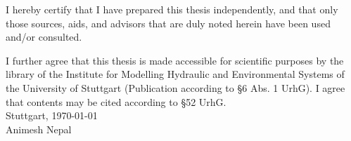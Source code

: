 \newpage
\thispagestyle{empty}

\vspace*{\fill}

I hereby certify that I have prepared this thesis independently, and that only
those sources, aids, and advisors that are duly noted herein have been used
and/or consulted.

I further agree that this thesis is made accessible for scientific purposes by the
library of the Institute for Modelling Hydraulic and Environmental Systems of
the University of Stuttgart (Publication according to {\S}6 Abs. 1 UrhG).
I agree that contents may be cited according to {\S}52 UrhG.\\[1cm]
Stuttgart, \today\\[2cm]
Animesh Nepal \\

\endinput